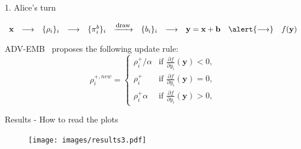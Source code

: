 \documentclass[10pt]{beamer}
\begin{document}
\begin{frame}{1. Alice's turn}

\begin{equation*}
\begin{array}{ccccccccccc}
    \mathbf{x} & \longrightarrow & \{\rho_i\}_i & \longrightarrow & \{\pi_i^b\}_i &   \xrightarrow{\mbox{\footnotesize{draw}}} & \{b_i\}_i &  \longrightarrow & \mathbf{y} = \mathbf{x} + \mathbf{b} & \alert{\longrightarrow}  & f(\mathbf{y}) \\
\end{array}
\end{equation*}

ADV-EMB~\cite{tang2019cnn} proposes the following update rule:
\begin{equation}
\rho_{i}^{+, new} = 
\left\{
    \begin{array}{ll}
        \rho_{i}^+/\alpha & \mbox{if } \frac{\partial f}{\partial y_{i}}\left(\mathbf{y}\right) < 0, \\
        \rho_{i}^+ & \mbox{if } \frac{\partial f}{\partial y_{i}}\left(\mathbf{y}\right) = 0, \\
        \rho_{i}^+ \alpha & \mbox{if } \frac{\partial f}{\partial y_{i}}\left(\mathbf{y}\right) > 0,
    \end{array}
\right.
\label{eq:qplus}
\end{equation}
\end{frame}
















\begin{frame}{Results - How to read the plots }
    \begin{figure}
        \texttt{[image: images/results3.pdf]}
    \end{figure}
\end{frame}
\end{document}

